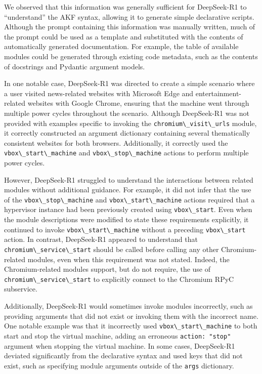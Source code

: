 \documentclass[letterpaper,12pt]{report}
\newcommand{\passthrough}[1]{#1}
\begin{document}
We observed that this information was generally sufficient for
DeepSeek-R1 to ``understand'' the AKF syntax, allowing it to generate
simple declarative scripts. Although the prompt containing this
information was manually written, much of the prompt could be used as a
template and substituted with the contents of automatically generated
documentation. For example, the table of available modules could be
generated through existing code metadata, such as the contents of
docstrings and Pydantic argument models.

In one notable case, DeepSeek-R1 was directed to create a simple
scenario where a user visited news-related websites with Microsoft Edge
and entertainment-related websites with Google Chrome, ensuring that the
machine went through multiple power cycles throughout the scenario.
Although DeepSeek-R1 was not provided with examples specific to invoking
the \passthrough{\lstinline!chromium\_visit\_urls!} module, it correctly
constructed an argument dictionary containing several thematically
consistent websites for both browsers. Additionally, it correctly used
the \passthrough{\lstinline!vbox\_start\_machine!} and
\passthrough{\lstinline!vbox\_stop\_machine!} actions to perform
multiple power cycles.

However, DeepSeek-R1 struggled to understand the interactions between
related modules without additional guidance. For example, it did not
infer that the use of the \passthrough{\lstinline!vbox\_stop\_machine!}
and \passthrough{\lstinline!vbox\_start\_machine!} actions required that
a hypervisor instance had been previously created using
\passthrough{\lstinline!vbox\_start!}. Even when the module descriptions
were modified to state these requirements explicitly, it continued to
invoke \passthrough{\lstinline!vbox\_start\_machine!} without a
preceding \passthrough{\lstinline!vbox\_start!} action. In contrast,
DeepSeek-R1 appeared to understand that
\passthrough{\lstinline!chromium\_service\_start!} should be called
before calling any other Chromium-related modules, even when this
requirement was not stated. Indeed, the Chromium-related modules
support, but do not require, the use of
\passthrough{\lstinline!chromium\_service\_start!} to explicitly connect
to the Chromium RPyC subservice.

Additionally, DeepSeek-R1 would sometimes invoke modules incorrectly,
such as providing arguments that did not exist or invoking them with the
incorrect name. One notable example was that it incorrectly used
\passthrough{\lstinline!vbox\_start\_machine!} to both start and stop
the virtual machine, adding an erroneous
\passthrough{\lstinline!action: "stop"!} argument when stopping the
virtual machine. In some cases, DeepSeek-R1 deviated significantly from
the declarative syntax and used keys that did not exist, such as
specifying module arguments outside of the
\passthrough{\lstinline!args!} dictionary.
\end{document}
